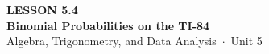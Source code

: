 \documentclass[aspectratio=169, 11pt]{beamer}
\begin{document}
{
\begin{frame}[plain]
  \vspace{2.8cm}\hspace{0.55cm}%
  \begin{minipage}{0.9\textwidth}
    {\color{goldacc}\bfseries\small LESSON 5.4}\\[0.5cm]
    {\color{white}\bfseries\LARGE Binomial Probabilities on the TI-84}\\[1.2cm]
    {\color{mistmid}\small Algebra, Trigonometry, and Data Analysis~$\cdot$~Unit 5}
  \end{minipage}
\end{frame}
}

\begin{frame}[t, plain]
\end{frame}
\end{document}
